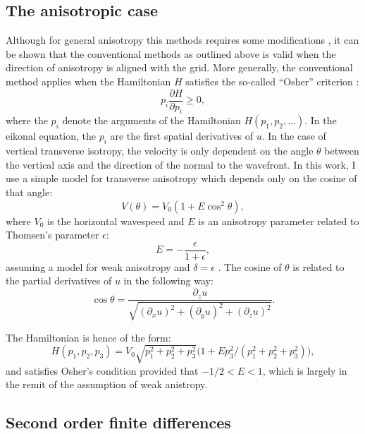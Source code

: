 \documentclass{article}
\begin{document}
\subsection{The anisotropic case}

Although for general anisotropy this methods requires some modifications \citep[e.g.][]{sethian03}, it can be shown that the conventional methods as outlined above is valid when the direction of anisotropy is aligned with the grid. More generally, the conventional method applies when the Hamiltonian $H$ satisfies the so-called ``Osher'' criterion \citep[see for instance a description in][]{tsai03}:
\begin{equation}\label{eq:osher}
  p_i\frac{\partial H}{\partial p_i} \geq 0,
\end{equation}
where the $p_i$ denote the arguments of the Hamiltonian $H(p_1,p_2,...)$. In the eikonal equation, the $p_i$ are the first spatial derivatives of $u$. In the case of vertical transverse isotropy, the velocity is only dependent on the angle $\theta$ between the vertical axis and the direction of the normal to the wavefront. In this work, I use a simple model for transverse anisotropy which depends only on the cosine of that angle:
\begin{equation}
  V(\theta) = V_0(1 + E\cos^2\theta),
\end{equation}
where $V_0$ is the horizontal wavespeed and $E$ is an anisotropy parameter related to Thomsen's parameter $\epsilon$:
\begin{equation}
  E = -\frac{\epsilon}{1+\epsilon},
\end{equation}
assuming a model for weak anisotropy and $\delta = \epsilon$ \citep{thomsen86}. The cosine of $\theta$ is related to the partial derivatives of $u$ in the following way:
\begin{equation}
  \cos\theta = \frac{\partial_zu}{\sqrt{ (\partial_xu)^2 + (\partial_yu)^2 + (\partial_zu)^2} }.
\end{equation}

The Hamiltonian is hence of the form:
\begin{equation}
H(p_1,p_2,p_3) = V_0\sqrt{p_1^2 + p_2^2 + p_3^2 }\big(1 + E p_3^2/(p_1^2 + p_2^2 + p_3^2)\big),
\end{equation}
and satisfies Osher's condition provided that $-1/2 < E < 1$, which is largely in the remit of the assumption of weak anistropy.

\subsection{Second order finite differences}
\end{document}

